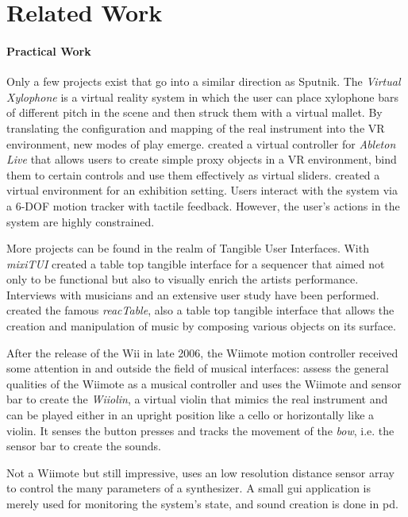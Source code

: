 \documentclass[10pt,a4paper]{scrartcl}
\begin{document}
\section{Related Work}
\paragraph{Practical Work}
Only a few projects exist that go into a similar direction as Sputnik. The \emph{Virtual Xylophone}\cite{Maki-Patola2005} is a virtual reality system in which the user can place xylophone bars of different pitch in the scene and then struck them with a virtual mallet. By translating the configuration and mapping of the real instrument into the VR environment, new modes of play emerge.
\cite{Zappi2010} created a virtual controller for \emph{Ableton Live} that allows users to create simple proxy objects in a VR environment, bind them to certain controls and use them effectively as virtual sliders. \cite{Rodet2005} created a virtual environment for an exhibition setting. Users interact with the system via a 6-DOF motion tracker with tactile feedback. However, the user's actions in the system are highly constrained.

More projects can be found in the realm of Tangible User Interfaces. With \emph{mixiTUI} \cite{Pedersen2009} created a table top tangible interface for a sequencer that aimed not only to be functional but also to visually enrich the artists performance. Interviews with musicians and an extensive user study have been performed. \cite{Jorda2007} created the famous \emph{reacTable}, also a table top tangible interface that allows the creation and manipulation of music by composing various objects on its surface. 

After the release of the Wii in late 2006, the Wiimote motion controller received some attention in and outside the field of musical interfaces: 
\cite{Kiefer2008} assess the general qualities of the Wiimote as a musical controller and \cite{Miller2010} uses the Wiimote and sensor bar to create the \emph{Wiiolin}, a virtual violin that mimics the real instrument and can be played either in an upright position like a cello or horizontally like a violin. It senses the button presses and tracks the movement of the \emph{bow}, i.e. the sensor bar to create the sounds.

Not a Wiimote but still impressive, \cite{Miyama2010} uses an low resolution distance sensor array to control the many parameters of a synthesizer. A small gui application is merely used for monitoring the system's state, and sound creation is done in pd.
\end{document}
